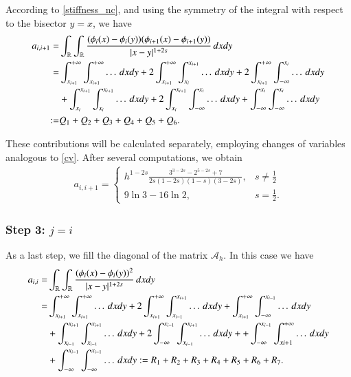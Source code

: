 According to \eqref{stiffness_nc}, and using the symmetry of the integral with respect to the bisector $y=x$, we have 
	\begin{align*}
	a_{i,i+1}= & \int_{\mathbb{R}}\int_{\mathbb{R}}\frac{(\phi_i(x)-\phi_i(y))(\phi_{i+1}(x)-\phi_{i+1}(y))}{|x-y|^{1+2s}}\,dxdy
	\\
	= & \int_{x_{i+1}}^{+\infty}\int_{x_{i+1}}^{+\infty} \ldots\,dxdy + 2\int_{x_{i+1}}^{+\infty}\int_{x_i}^{x_{i+1}} \ldots\,dxdy + 2\int_{x_{i+1}}^{+\infty}\int_{-\infty}^{x_i} \ldots\,dxdy 
	\\
	& + \int_{x_i}^{x_{i+1}}\int_{x_i}^{x_{i+1}} \ldots\,dxdy + 2\int_{x_i}^{x_{i+1}}\int_{-\infty}^{x_i} \ldots\,dxdy + \int_{-\infty}^{x_i}\int_{-\infty}^{x_i} \ldots\,dxdy 
	\\
	:= & Q_1 + Q_2 + Q_3 + Q_4 + Q_5 + Q_6.
\end{align*}

These contributions will be calculated separately, employing changes of variables analogous to \eqref{cv}. After several computations, we obtain
\begin{align}\label{Aii1}
	a_{i,i+1} = \begin{cases}
					\displaystyle h^{1-2s}\frac{3^{3-2s}-2^{5-2s}+7}{2s(1-2s)(1-s)(3-2s)}, & \displaystyle s\neq \frac{1}{2}
					\\
					9\ln 3-16\ln 2, & \displaystyle s=\frac{1}{2}.
				\end{cases}	
\end{align}

\subsubsection*{Step 3: $j= i$}
As a last step, we fill the diagonal of the matrix $\mathcal A_h$. In this case we have
	\begin{align*}
	a_{i,i}= & \int_{\mathbb{R}}\int_{\mathbb{R}}\frac{(\phi_i(x)-\phi_i(y))^2}{|x-y|^{1+2s}}\,dxdy
	\\
	= & \int_{x_{i+1}}^{+\infty}\int_{x_{i+1}}^{+\infty} \ldots\,dxdy + 2\int_{x_{i+1}}^{+\infty}\int_{x_{i-1}}^{x_{i+1}} \ldots\,dxdy + \int_{x_{i+1}}^{+\infty}\int_{-\infty}^{x_{i-1}} \ldots\,dxdy 
	\\
	& + \int_{x_{i-1}}^{x_{i+1}}\int_{x_{i-1}}^{x_{i+1}} \ldots\,dxdy + 2\int_{-\infty}^{x_{i-1}}\int_{x_{i-1}}^{x_{i+1}} \ldots\,dxdy + + \int_{-\infty}^{x_{i-1}}\int_{x{i+1}}^{+\infty} \ldots\,dxdy 
	\\
	& +  \int_{-\infty}^{x_{i-1}}\int_{-\infty}^{x_{i-1}} \ldots\,dxdy := R_1 + R_2 + R_3 + R_4 + R_5 + R_6 + R_7.
\end{align*}

